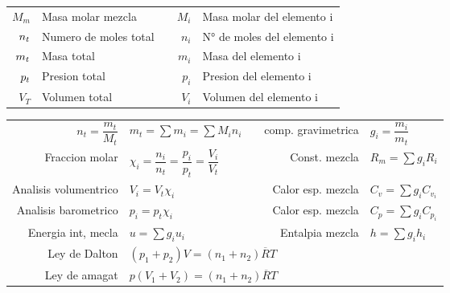 \documentclass[a4paper, 11pt,titlepage]{book}
\begin{document}
\begin{tcolorbox}[title = \large\textbf{Mezcla de gases}]

	\begin{tabular}{r l c r l}
		\vspace{.3cm} $M_m$ & Masa molar mezcla && $M_i$ & Masa molar del elemento i \\
		\vspace{.3cm} $n_{\small{t}}$ & Numero de moles total && $n_i$ & N° de moles del elemento i \\
		\vspace{.3cm} $m_{\small{t}}$ & Masa total && $m_i$ & Masa del elemento i \\
		\vspace{.3cm} $p_{\small{t}}$ & Presion total && $p_i$ & Presion del elemento i \\
		\vspace{.3cm} $V_T$ & Volumen total && $V_i$ & Volumen del elemento i \\
	\end{tabular}

		\begin{center}
				\begin{tabular}{r | l c r | l}
					\vspace{.3cm}	$n_t = \dfrac{m_t}{M_t}$ & $m_t = \sum m_i = \sum M_i n_i$ && comp. gravimetrica & $g_i = \dfrac{m_i}{m_t}$ \\
					\vspace{.3cm}	Fraccion molar & $\chi_i = \dfrac{n_i}{n_t} = \dfrac{p_i}{p_t} =\dfrac{V_i}{V_t} $ && Const. mezcla & $R_m = \sum g_i R_i$\\
					\vspace{.3cm}	Analisis volumentrico & $V_i = V_t \chi_i$ && Calor esp. mezcla & $C_v = \sum g_i C_{v_i}$\\
					\vspace{.3cm}	Analisis barometrico & $p_i = p_t \chi_i$ && Calor esp. mezcla & $C_p = \sum g_i C_{p_i}$\\
					\vspace{.3cm}	Energia int, mecla & $u = \sum g_i u_i$ && Entalpia mezcla & $h = \sum g_i h_i$\\
					\vspace{.3cm}	Ley de Dalton & \multicolumn{4}{l}{$(p_1 + p_2)V = (n_1 + n_2)\overline{R}T $ }\\
					\vspace{.3cm}   Ley de amagat & \multicolumn{4}{l}{$p (V_1 + V_2) = (n_1 + n_2)\overline{R}T$}\\
					\end{tabular}
			\end{center}
\end{tcolorbox}
\end{document}
